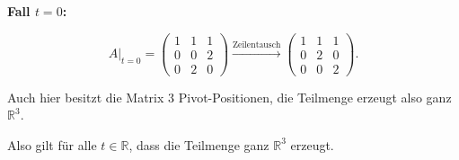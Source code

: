 \documentclass[a4paper,12pt]{article}
\begin{document}
\bigskip
\noindent\textbf{Fall $t = 0$:}

\[
A\big|_{t=0} = \begin{pmatrix}1 & 1 & 1 \\ 0 & 0 & 2 \\ 0 & 2 & 0\end{pmatrix}
\xrightarrow{\text{Zeilentausch}}
\begin{pmatrix}1 & 1 & 1 \\ 0 & 2 & 0 \\ 0 & 0 & 2\end{pmatrix}.
\]

Auch hier besitzt die Matrix 3 Pivot-Positionen, die Teilmenge erzeugt also ganz $\mathbb{R}^3$.

\bigskip
Also gilt für alle $t \in \mathbb{R}$, dass die Teilmenge ganz $\mathbb{R}^3$ erzeugt.
\end{document}
